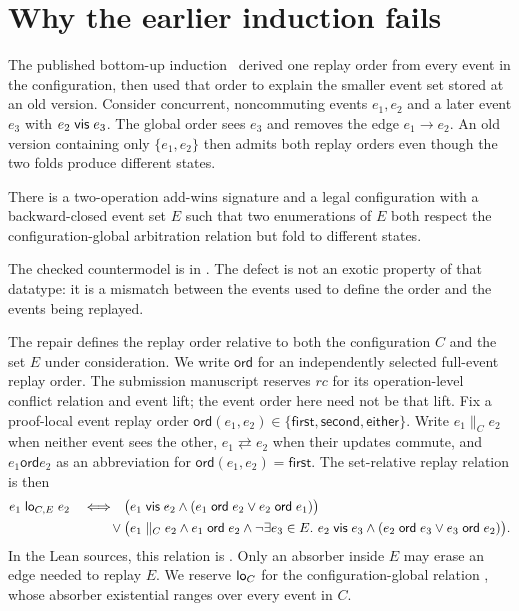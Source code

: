 \section{Why the earlier induction fails}

The published bottom-up induction~\cite{soundarapandian2025automatic} derived
one replay order from every event in the configuration, then used that order
to explain the smaller event set stored at an old version. Consider concurrent,
noncommuting events $e_1,e_2$ and a later event $e_3$ with $e_2\mathrel{\mathsf{vis}} e_3$. The
global order sees $e_3$ and removes the edge $e_1\to e_2$. An old version
containing only $\{e_1,e_2\}$ then admits both replay orders even though the
two folds produce different states.

\begin{proposition}
There is a two-operation add-wins signature and a legal configuration with a
backward-closed event set $E$ such that two enumerations of $E$ both respect
the configuration-global arbitration relation but fold to different states.
\hfill{}
\end{proposition}

The checked countermodel is in
. The defect is not an
exotic property of that datatype: it is a mismatch between the events used to
define the order and the events being replayed.

The repair defines the replay order relative to both the configuration $C$ and
the set $E$ under consideration. We write $\mathsf{ord}$ for an
independently selected full-event replay order. The submission manuscript
reserves $rc$ for its operation-level conflict relation and event lift;
the event order here need not be that lift. Fix a proof-local event replay order
$\mathsf{ord}(e_1,e_2)\in
\{\mathsf{first},\mathsf{second},\mathsf{either}\}$. Write
$e_1\parallel_C e_2$ when neither event sees the other,
$e_1\rightleftarrows e_2$ when their updates commute, and
$e_1\mathrel{\mathsf{ord}}e_2$ as an abbreviation for
$\mathsf{ord}(e_1,e_2)=\mathsf{first}$. The set-relative replay relation is
then
\begin{align*}
e_1\mathrel{\mathsf{lo}_{C,E}}e_2\quad\Longleftrightarrow\quad
 &\bigl(e_1\mathrel{\mathsf{vis}} e_2\land(e_1\mathrel{\mathsf{ord}}e_2\lor e_2\mathrel{\mathsf{ord}}e_1)\bigr)\\
 {}\lor{}&\bigl(e_1\parallel_C e_2\land
 e_1\mathrel{\mathsf{ord}}e_2\land
 \neg\exists e_3\in E.\ e_2\mathrel{\mathsf{vis}} e_3\land
   (e_2\mathrel{\mathsf{ord}}e_3\lor e_3\mathrel{\mathsf{ord}}e_2)\bigr).
\end{align*}
In the Lean sources, this relation is . Only an absorber inside
$E$ may erase an edge needed to replay $E$. We reserve $\mathsf{lo}_C$ for the
configuration-global relation , whose absorber existential ranges
over every event in $C$.

